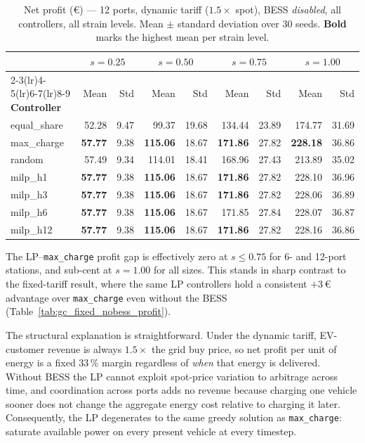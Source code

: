 \begin{table}[!htb]
\centering
\caption{Net profit (€) — 12 ports, dynamic tariff ($1.5\times$ spot),
         BESS \emph{disabled}, all controllers, all strain levels.
         Mean $\pm$ standard deviation over 30 seeds.
         \textbf{Bold} marks the highest mean per strain level.}
\label{tab:gc_dyn_nobess_ms_12p}
\setlength{\tabcolsep}{4.5pt}
\begin{tabular}{l rr rr rr rr}
\toprule
 & \multicolumn{2}{c}{$s=0.25$}
 & \multicolumn{2}{c}{$s=0.50$}
 & \multicolumn{2}{c}{$s=0.75$}
 & \multicolumn{2}{c}{$s=1.00$} \\
\cmidrule(lr){2-3}\cmidrule(lr){4-5}\cmidrule(lr){6-7}\cmidrule(lr){8-9}
\textbf{Controller} & Mean & Std & Mean & Std & Mean & Std & Mean & Std \\
\midrule
equal\_share &  52.28 &  9.47 &  99.37 & 19.68 & 134.44 & 23.89 & 174.77 & 31.69 \\
max\_charge  & \textbf{57.77} &  9.38 & \textbf{115.06} & 18.67 & \textbf{171.86} & 27.82 & \textbf{228.18} & 36.86 \\
random       &  57.49 &  9.34 & 114.01 & 18.41 & 168.96 & 27.43 & 213.89 & 35.02 \\
milp\_h1     & \textbf{57.77} &  9.38 & \textbf{115.06} & 18.67 & \textbf{171.86} & 27.82 & 228.10 & 36.96 \\
milp\_h3     & \textbf{57.77} &  9.38 & \textbf{115.06} & 18.67 & \textbf{171.86} & 27.82 & 228.06 & 36.89 \\
milp\_h6     & \textbf{57.77} &  9.38 & \textbf{115.06} & 18.67 & 171.85 & 27.84 & 228.07 & 36.87 \\
milp\_h12    & \textbf{57.77} &  9.38 & \textbf{115.06} & 18.67 & \textbf{171.86} & 27.82 & 228.16 & 36.86 \\
\bottomrule
\end{tabular}
\end{table}

The LP–\texttt{max\_charge} profit gap is effectively zero at $s \leq 0.75$
for 6- and 12-port stations, and sub-cent at $s=1.00$ for all sizes.  This
stands in sharp contrast to the fixed-tariff result, where the same LP
controllers hold a consistent $+3$\,€ advantage over \texttt{max\_charge}
even without the BESS (Table~\ref{tab:gc_fixed_nobess_profit}).

The structural explanation is straightforward.  Under the dynamic tariff,
EV-customer revenue is always $1.5\times$ the grid buy price, so net profit
per unit of energy is a fixed 33\,\% margin regardless of \emph{when} that
energy is delivered.  Without BESS the LP cannot exploit spot-price variation
to arbitrage across time, and coordination across ports adds no revenue
because charging one vehicle sooner does not change the aggregate energy cost
relative to charging it later.  Consequently, the LP degenerates to the same
greedy solution as \texttt{max\_charge}: saturate available power on every
present vehicle at every timestep.

